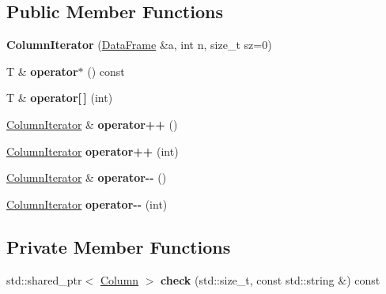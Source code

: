\subsection*{Public Member Functions}
\begin{DoxyCompactItemize}
\item 
\mbox{\label{classDataFrame_1_1ColumnIterator_acfbf7a899ff3c6db441e36f10c652d4c}} 
{\bfseries Column\+Iterator} (\hyperlink{classDataFrame}{Data\+Frame} \&a, int n, size\+\_\+t sz=0)
\item 
\mbox{\label{classDataFrame_1_1ColumnIterator_ae0ed020c832499ccce268ac495ce39c0}} 
T \& {\bfseries operator$\ast$} () const
\item 
\mbox{\label{classDataFrame_1_1ColumnIterator_aa76fd764e2b1814221ca35857aa55e51}} 
T \& {\bfseries operator\mbox{[}$\,$\mbox{]}} (int)
\item 
\mbox{\label{classDataFrame_1_1ColumnIterator_a3b21d2d4e0d21791b01f40dc69b0935a}} 
\hyperlink{classDataFrame_1_1ColumnIterator}{Column\+Iterator} \& {\bfseries operator++} ()
\item 
\mbox{\label{classDataFrame_1_1ColumnIterator_ab6b12782f41c8b37b2e86726c570d713}} 
\hyperlink{classDataFrame_1_1ColumnIterator}{Column\+Iterator} {\bfseries operator++} (int)
\item 
\mbox{\label{classDataFrame_1_1ColumnIterator_a890a43be71c7d138e2364ecc69ec13f5}} 
\hyperlink{classDataFrame_1_1ColumnIterator}{Column\+Iterator} \& {\bfseries operator-\/-\/} ()
\item 
\mbox{\label{classDataFrame_1_1ColumnIterator_a369bd7ee30e3a41e60dd3a6e832c9519}} 
\hyperlink{classDataFrame_1_1ColumnIterator}{Column\+Iterator} {\bfseries operator-\/-\/} (int)
\end{DoxyCompactItemize}
\subsection*{Private Member Functions}
\begin{DoxyCompactItemize}
\item 
\mbox{\label{classDataFrame_1_1ColumnIterator_a493ea9898c83a6d18202621eba43b630}} 
std\+::shared\+\_\+ptr$<$ \hyperlink{classColumn}{Column} $>$ {\bfseries check} (std\+::size\+\_\+t, const std\+::string \&) const
\end{DoxyCompactItemize}
